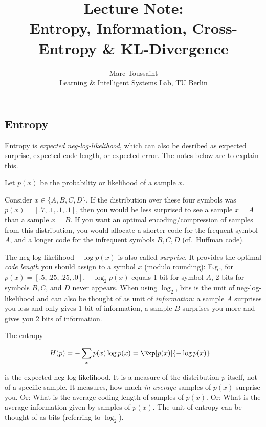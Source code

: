 %
\note

\title{Lecture Note:\\ Entropy, Information, Cross-Entropy \& KL-Divergence}
\author{Marc Toussaint\\\small Learning \& Intelligent Systems Lab, TU Berlin}

\makeatletter
\renewcommand{\@seccntformat}[1]{}
\makeatother

\notetitle



\subsection{Entropy}

Entropy is \emph{expected neg-log-likelihood}, which can also be
desribed as expected surprise, expected code length, or expected
error. The notes below are to explain this.

Let $p(x)$ be the probability or likelihood of a sample $x$.

Consider $x \in \{A,B,C,D\}$. If the distribution over these four symbols was $p(x) = [.7, .1, .1, .1]$, then you would be less surprised to see a sample $x=A$ than a sample $x=B$. If you want an optimal encoding/compression of samples from this distribution, you would allocate a shorter code for the frequent symbol $A$, and a longer code for the infrequent symbols $B,C,D$ (cf.\ Huffman code).

The neg-log-likelihood $-\log p(x)$ is also called \emph{surprise}. It
provides the optimal \emph{code length} you should assign to a symbol
$x$ (modulo rounding): E.g., for $p(x) = [.5, .25, .25, .0]$, $-\log_2 p(x)$ equals 1 bit for symbol $A$, 2 bits for symbols $B,C$, and $D$ never appears. When using $\log_2$, bits is the unit of neg-log-likelihood and can also be thought of as unit of \emph{information}: a sample $A$ surprises you less and only gives 1 bit of information, a sample $B$ surprises you more and gives you 2 bits of information.

The entropy

\begin{align}
H(p) &= - \sum_x p(x) \log p(x) = \Exp[p(x)]{-\log p(x)}
\end{align}

is the expected neg-log-likelihood. It is a measure of the
distribution $p$ itself, not of a specific sample. It measures, how
much \emph{in average} samples of $p(x)$ surprise you. Or: What is the
average coding length of samples of $p(x)$. Or: What is the average information given by samples of $p(x)$. The unit of entropy can be thought of as bits (referring to $\log_2$). 


